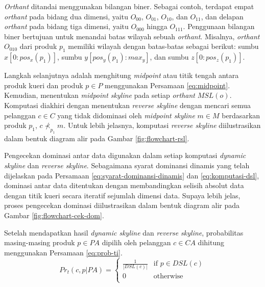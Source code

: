 \textit{Orthant} ditandai menggunakan bilangan biner. Sebagai contoh, terdapat empat \textit{orthant} pada bidang dua dimensi, yaitu $O_{00}$, $O_{01}$, $O_{10}$, dan $O_{11}$, dan delapan \textit{orthant} pada bidang tiga dimensi, yaitu $O_{000}$ hingga $O_{111}$. Penggunaan bilangan biner bertujuan untuk menandai batas wilayah sebuah \textit{orthant}. Misalnya, \textit{orthant} $O_{010}$ dari produk $p_1$ memiliki wilayah dengan batas-batas sebagai berikut: sumbu $x [0:pos_x(p_1)]$, sumbu $y [pos_y(p_1):max_y]$, dan sumbu $z [0:pos_z(p_1)]$.

Langkah selanjutnya adalah menghitung \textit{midpoint} atau titik tengah antara produk kueri dan produk $p \in P$ menggunakan Persamaan \ref{eq:midpoint}. Kemudian, menentukan \textit{midpoint skyline} pada setiap \textit{orthant} $MSL(o)$. Komputasi diakhiri dengan menentukan \textit{reverse skyline} dengan mencari semua pelanggan $c \in C$ yang tidak didominasi oleh \textit{midpoint skyline} $m \in M$ berdasarkan produk $p_1$, $c \nprec_{p_1} m$. Untuk lebih jelasnya, komputasi \textit{reverse skyline} diilustrasikan dalam bentuk diagram alir pada Gambar \ref{fig:flowchart-rsl}.


Pengecekan dominasi antar data digunakan dalam setiap komputasi \textit{dynamic skyline} dan \textit{reverse skyline}. Sebagaimana syarat dominansi dinamis yang telah dijelaskan pada Persamaan \ref{eq:syarat-dominansi-dinamis} dan \ref{eq:komputasi-dsl}, dominasi antar data ditentukan dengan membandingkan selisih absolut data dengan titik kueri secara iteratif sejumlah dimensi data. Supaya lebih jelas, proses pengecekan dominasi diilustrasikan dalam bentuk diagram alir pada Gambar \ref{fig:flowchart-cek-dom}.


Setelah mendapatkan hasil \textit{dynamic skyline} dan \textit{reverse skyline}, probabilitas masing-masing produk $p \in PA$ dipilih oleh pelanggan $c \in CA$ dihitung menggunakan Persamaan \ref{eq:prob-ti}.
\begin{equation}\label{eq:prob-ti}
Pr_t(c, p|PA) = \left\{
\begin{array}{ll}
\frac{1}{|DSL(c)|} & \text{if } p \in DSL(c)\\
0 & \text{otherwise}\\
\end{array}
\right.
\end{equation}

